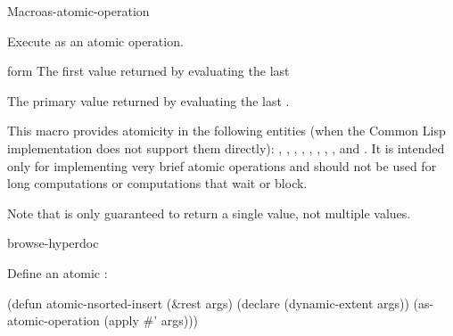 \documentclass[10pt,twoside,english,pdftex]{article}
\begin{document}
\begin{functiondoc}{Macro}{as-atomic-operation}%
  {
    }

\fnsyntax

\fnpurpose Execute  as an atomic operation.

\fnpackage {}

\fnmodule {}

\fnargs
\begin{args}{form}
 The first value returned by evaluating the last 
\end{args}

\fnreturns The primary value returned by evaluating the last
.

\fndescription This macro provides atomicity in the following entities (when
the Common Lisp implementation does not support them directly):
%
,
,
,
, 
,
,
,
, and
.  
%
It is intended only for implementing very brief atomic operations and should
not be used for long computations or computations that wait or block.

Note that  is only guaranteed to return a
single value, not multiple values.

\begin{alsos}{browse-hyperdoc}
\end{alsos}

\fnexample
Define an atomic :
%
\W\supp
\begin{example}
  (defun atomic-nsorted-insert (\&rest args)
    (declare (dynamic-extent args))
    (as-atomic-operation (apply #' args)))
\end{example}

\end{functiondoc}

\end{document}
